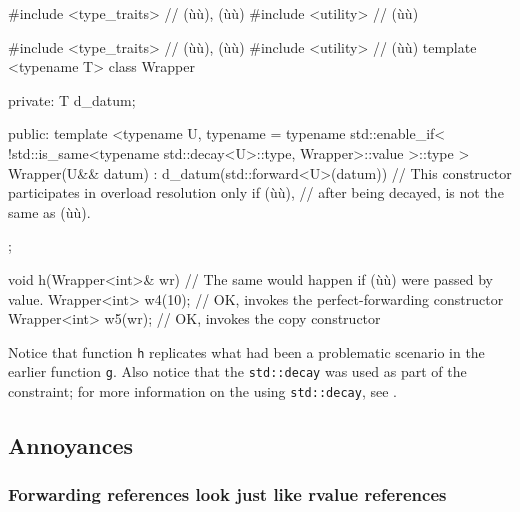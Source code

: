 \begin{emcppshiddenlisting}[emcppsbatch=e19]
#include <type_traits>  // (ù{}ù), (ù{}ù)
#include <utility>  // (ù{}ù)
\end{emcppshiddenlisting}
\begin{emcppslisting}[emcppsbatch=e19]
#include <type_traits> // (ù{}ù),  (ù{}ù)
#include <utility>     // (ù{}ù)
template <typename T>
class Wrapper
{
private:
    T d_datum;

public:
    template <typename U,
        typename = typename std::enable_if<
            !std::is_same<typename std::decay<U>::type, Wrapper>::value
        >::type
    >
    Wrapper(U&& datum) : d_datum(std::forward<U>(datum)) { }
        // This constructor participates in overload resolution only if (ù{}ù),
        // after being decayed, is not the same as (ù{}ù).
};

void h(Wrapper<int>& wr)  // The same would happen if (ù{}ù) were passed by value.
{
    Wrapper<int> w4(10);  // OK, invokes the perfect-forwarding constructor
    Wrapper<int> w5(wr);  // OK, invokes the copy constructor
}
\end{emcppslisting}

\noindent Notice that function \lstinline!h! replicates what had been a problematic scenario in the earlier function \lstinline!g!. Also notice that the \lstinline!std::decay!  was used as
part of the constraint; for more information on the using
\lstinline!std::decay!, see . 

\subsection[Annoyances]{Annoyances}\label{annoyances-forwardingref}

\subsubsection[Forwarding references look just like rvalue references]{Forwarding references look just like rvalue references}\label{forwarding-references-look-just-like-rvalue-references}

